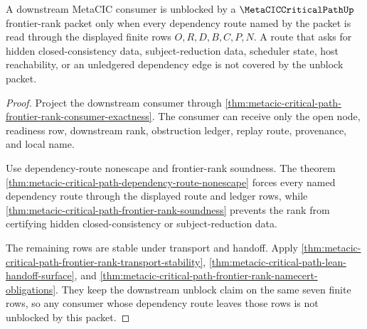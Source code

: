 \begin{theorem}
\label{thm:metacic-critical-path-downstream-unblock-coverage}
A downstream MetaCIC consumer is unblocked by a $\MetaCICCriticalPathUp$ frontier-rank packet only when every dependency route named by the packet is read through the displayed finite rows $O,R,D,B,C,P,N$. A route that asks for hidden closed-consistency data, subject-reduction data, scheduler state, host reachability, or an unledgered dependency edge is not covered by the unblock packet.
\end{theorem}
\begin{proof}
Project the downstream consumer through \autoref{thm:metacic-critical-path-frontier-rank-consumer-exactness}. The consumer can receive only the open node, readiness row, downstream rank, obstruction ledger, replay route, provenance, and local name.

Use dependency-route nonescape and frontier-rank soundness. The theorem \autoref{thm:metacic-critical-path-dependency-route-nonescape} forces every named dependency route through the displayed route and ledger rows, while \autoref{thm:metacic-critical-path-frontier-rank-soundness} prevents the rank from certifying hidden closed-consistency or subject-reduction data.

The remaining rows are stable under transport and handoff. Apply \autoref{thm:metacic-critical-path-frontier-rank-transport-stability}, \autoref{thm:metacic-critical-path-lean-handoff-surface}, and \autoref{thm:metacic-critical-path-frontier-rank-namecert-obligations}. They keep the downstream unblock claim on the same seven finite rows, so any consumer whose dependency route leaves those rows is not unblocked by this packet.
\end{proof}

